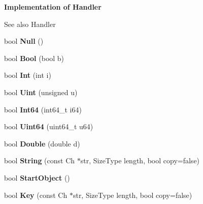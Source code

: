 \begin{Indent}\textbf{ Implementation of Handler}\par
{\em \begin{DoxySeeAlso}{See also}
Handler 
\end{DoxySeeAlso}
}\begin{DoxyCompactItemize}
\item 
\mbox{\label{classPrettyWriter_acbcab646050e5e9204ab2b13c798092b}} 
bool {\bfseries Null} ()
\item 
\mbox{\label{classPrettyWriter_afddf1586eeba72bc4fbb0e1346ced9b9}} 
bool {\bfseries Bool} (bool b)
\item 
\mbox{\label{classPrettyWriter_a14da2a84e9f41ba42edf2819363be614}} 
bool {\bfseries Int} (int i)
\item 
\mbox{\label{classPrettyWriter_a65227d9de9a9f92eb3ca83c616a9c809}} 
bool {\bfseries Uint} (unsigned u)
\item 
\mbox{\label{classPrettyWriter_a2ce0d71e221d72b8cf17d2b60ae610af}} 
bool {\bfseries Int64} (int64\+\_\+t i64)
\item 
\mbox{\label{classPrettyWriter_a888229dc2e5a15b2fd577b47e86a17b3}} 
bool {\bfseries Uint64} (uint64\+\_\+t u64)
\item 
\mbox{\label{classPrettyWriter_a20ffcf3ada1be664719f44cec76711ed}} 
bool {\bfseries Double} (double d)
\item 
\mbox{\label{classPrettyWriter_ae6cec4b69e86cff3121451f29e4862ef}} 
bool {\bfseries String} (const Ch $\ast$str, Size\+Type length, bool copy=false)
\item 
\mbox{\label{classPrettyWriter_a445e063722149f86bf1a0cd7b8892f07}} 
bool {\bfseries Start\+Object} ()
\item 
\mbox{\label{classPrettyWriter_a26932858cdca972598f7caa6f415f310}} 
bool {\bfseries Key} (const Ch $\ast$str, Size\+Type length, bool copy=false)
\item 

\end{DoxyCompactItemize}
\end{Indent}
